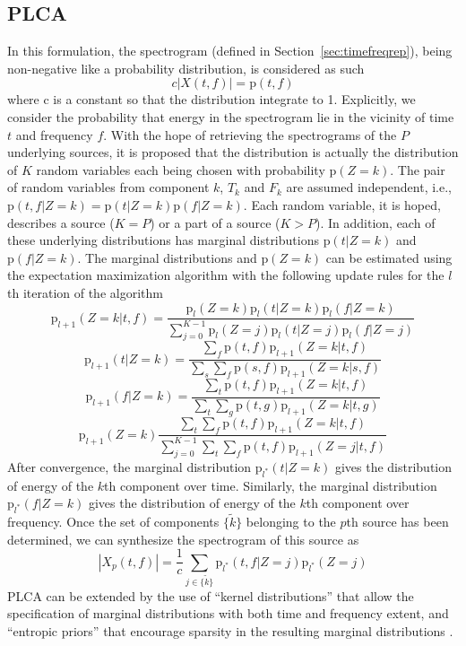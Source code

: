 \subsection{PLCA}

In this formulation, the spectrogram (defined in Section~\ref{sec:timefreqrep}),
being non-negative like a probability distribution, is considered as such
\[
    c|X(t,f)| = \mathrm{p} (t,f)
\]
where c is a constant so that the distribution integrate to 1. Explicitly,
we consider the probability that energy in the spectrogram lie in the vicinity
of time $t$ and frequency $f$. With the hope of retrieving the spectrograms of
the $P$ underlying sources, it is proposed
that the distribution is actually the distribution of $K$ random variables each
being chosen with probability $\mathrm{p}(Z=k)$. The pair of random variables
from component $k$, $T_{k}$ and $F_{k}$ are assumed independent, i.e.,
$\mathrm{p}(t,f|Z=k)=\mathrm{p}(t|Z=k)\mathrm{p}(f|Z=k)$. Each random variable, it is
hoped, describes a source ($K=P$) or a part of a source ($K>P$). In addition,
each of these underlying distributions has marginal distributions $\mathrm{p}(t
| Z=k)$ and $\mathrm{p}(f | Z=k)$. The marginal distributions and
$\mathrm{p}(Z=k)$ can be estimated using the expectation maximization
algorithm
with the following update rules for the $l$th iteration of the
algorithm \cite{smaragdis2006probabilistic}
\[
    \mathrm{p}_{l+1}(Z=k | t, f)
    =
    \frac{\mathrm{p}_{l}(Z=k)\mathrm{p}_{l}(t|Z=k)\mathrm{p}_{l}(f|Z=k)}
    {\sum_{j=0}^{K-1}{\mathrm{p}_{l}(Z=j)\mathrm{p}_{l}(t|Z=j)\mathrm{p}_{l}(f|Z=j)}}
\]
\[
    \mathrm{p}_{l+1}(t|Z=k)
    =
    \frac{\sum_{f}\mathrm{p}(t,f)\mathrm{p}_{l+1}(Z=k|t,f)}
    {\sum_{s}\sum_{f}\mathrm{p}(s,f)\mathrm{p}_{l+1}(Z=k|s,f)}
\]
\[
    \mathrm{p}_{l+1}(f|Z=k)
    =
    \frac{\sum_{t}\mathrm{p}(t,f)\mathrm{p}_{l+1}(Z=k|t,f)}
    {\sum_{t}\sum_{g}\mathrm{p}(t,g)\mathrm{p}_{l+1}(Z=k|t,g)}
\]
\[
    \mathrm{p}_{l+1}(Z=k)
    \frac{\sum_{t}\sum_{f}\mathrm{p}(t,f)\mathrm{p}_{l+1}(Z=k|t,f)}
    {\sum_{j=0}^{K-1}\sum_{t}\sum_{f}\mathrm{p}(t,f)\mathrm{p}_{l+1}(Z=j|t,f)}
\]
After convergence, the marginal distribution $\mathrm{p}_{l^{\ast}}(t|Z=k)$
gives the distribution of energy of the $k$th component over time. Similarly, 
the marginal distribution $\mathrm{p}_{l^{\ast}}(f|Z=k)$
gives the distribution of energy of the $k$th component over frequency. Once the
set of components $\{ \tilde{k} \}$ belonging to the $p$th source has been
determined, we can synthesize the spectrogram of this source as
\[
    |X_{p}(t,f)| = \frac{1}{c}
    \sum_{j \in
    \{\tilde{k}\}}\mathrm{p}_{l^{\ast}}(t,f|Z=j)\mathrm{p}_{l^{\ast}}(Z=j)
\]
PLCA can be extended by the use of ``kernel distributions'' that allow the
specification of marginal distributions with both time and frequency extent, and
``entropic priors'' that encourage sparsity in the resulting marginal
distributions \cite{shashanka2008probabilistic}.

